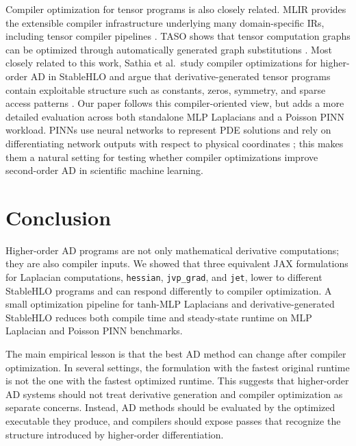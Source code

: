 \documentclass{article}
\theoremstyle{plain}
\theoremstyle{definition}
\theoremstyle{remark}
\begin{document}
Compiler optimization for tensor programs is also closely related.  MLIR
provides the extensible compiler infrastructure underlying many domain-specific
IRs, including tensor compiler pipelines \cite{lattner2021mlir}.  TASO shows
that tensor computation graphs can be optimized through automatically generated
graph substitutions \cite{jia2019taso}.  Most closely related to this work,
Sathia et al.\ study compiler optimizations for higher-order AD in StableHLO and
argue that derivative-generated tensor programs contain exploitable structure
such as constants, zeros, symmetry, and sparse access patterns
\cite{sathia2025compiler}.  Our paper follows this compiler-oriented view, but
adds a more detailed evaluation across both standalone MLP Laplacians and a
Poisson PINN workload.  PINNs use neural networks to represent PDE solutions and
rely on differentiating network outputs with respect to physical coordinates
\cite{raissi2019physics}; this makes them a natural setting for testing whether
compiler optimizations improve second-order AD in scientific machine learning.

\section{Conclusion}
Higher-order AD programs are not only mathematical derivative computations; they
are also compiler inputs.  We showed that three equivalent JAX formulations for
Laplacian computations, \texttt{hessian}, \texttt{jvp\_grad}, and
\texttt{jet}, lower to different StableHLO programs and can respond differently
to compiler optimization.  A small optimization pipeline for tanh-MLP
Laplacians and derivative-generated StableHLO reduces both compile time and
steady-state runtime on MLP Laplacian and Poisson PINN benchmarks.

The main empirical lesson is that the best AD method can change after compiler
optimization.  In several settings, the formulation with the fastest original
runtime is not the one with the fastest optimized runtime.  This suggests that
higher-order AD systems should not treat derivative generation and compiler
optimization as separate concerns.  Instead, AD methods should be evaluated by
the optimized executable they produce, and compilers should expose passes that
recognize the structure introduced by higher-order differentiation.



\end{document}
